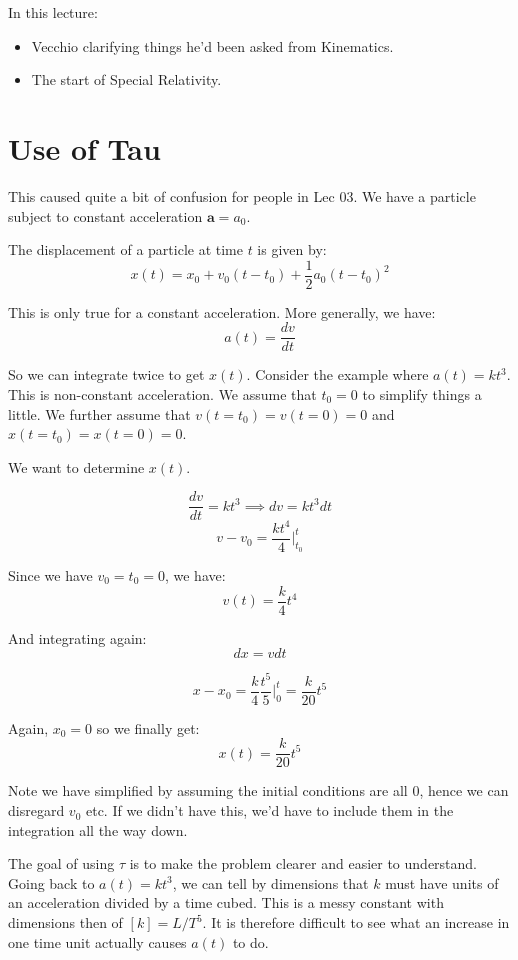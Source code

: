 
In this lecture:
\begin{itemize}
    \item Vecchio clarifying things he'd been asked from Kinematics.
    \item The start of Special Relativity.
\end{itemize}

\section{Use of Tau}
This caused quite a bit of confusion for people in Lec 03. We have a particle subject to constant acceleration $\pmb{a} = a_0$.

The displacement of a particle at time $t$ is given by:
\[
    x(t) = x_0 + v_0(t-t_0) + \frac{1}{2}a_0(t-t_0)^2
\]

This is only true for a constant acceleration. More generally, we have:
\[
    a(t) = \frac{dv}{dt}
\]

So we can integrate twice to get $x(t)$. Consider the example where $a(t) = kt^3$. This is non-constant acceleration. We assume that $t_0 = 0$ to simplify things a little. We further assume that $v(t = t_0) = v(t = 0) = 0$ and $x(t = t_0) = x(t=0) = 0$. 

We want to determine $x(t)$.

\[
    \frac{dv}{dt} = kt^3  \implies dv = kt^3 dt
\]
\[
    v - v_0 = \frac{kt^4}{4} \biggr\rvert_{t_0}^{t}
\]

Since we have $v_0 = t_0 = 0$, we have:
\[
    v(t) = \frac{k}{4} t^4
\]

And integrating again:
\[
    dx = v dt
\]

\[
    x - x_0 = \frac{k}{4} \frac{t^5}{5} \biggr\rvert^t_0 = \frac{k}{20}t^5
\]

Again, $x_0 = 0$ so we finally get:
\[
    x(t) = \frac{k}{20} t^5
\]

Note we have simplified by assuming the initial conditions are all $0$, hence we can disregard $v_0$ etc. If we didn't have this, we'd have to include them in the integration all the way down.

The goal of using $\tau$ is to make the problem clearer and easier to understand. Going back to $a(t) = kt^3$, we can tell by dimensions that $k$ must have units of an acceleration divided by a time cubed. This is a messy constant with dimensions then of $[k] = L / T^5$. It is therefore difficult to see what an increase in one time unit actually causes $a(t)$ to do.
 
